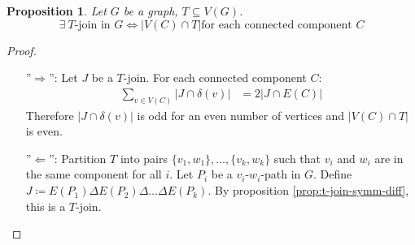\documentclass[11pt, a4paper]{article}
\newcommand{\abs}[1]{\left\lvert#1\right\rvert}
\newcommand{\set}[1]{\{#1\}}
\newtheorem{prop}[theorem]{Proposition}
\theoremstyle{remark}
\theoremstyle{definition}
\begin{document}
\begin{prop}
Let $G$ be a graph, $T\subseteq V(G)$.
\[\exists\ T\text{-join in }G \Leftrightarrow \abs{V(C)\cap T}\text{for each
connected component }C\]
\end{prop}
\begin{proof}\ 
\begin{enumerate}
\item[''$\Rightarrow$'':]
Let $J$ be a $T$-join. For each connected component $C$:
\begin{align*}
	\sum_{v\in V(C)}\abs{J\cap \delta(v)}&=2\abs{J\cap E(C)}
\end{align*}
Therefore $\abs{J\cap\delta(v)}$ is odd for an even number of vertices and
$\abs{V(C)\cap T}$ is even.

\item[''$\Leftarrow$'':]
Partition $T$ into pairs $\set{v_1,w_1},\ldots,\set{v_k,w_k}$ such that
$v_i$ and $w_i$ are in the same component for all $i$. Let $P_i$ be a
$v_i$-$w_i$-path in $G$. Define $J\coloneqq E(P_1)\Delta E(P_2)\Delta\ldots
\Delta E(P_k)$. By proposition \ref{prop:t-join-symm-diff}, this is a
$T$-join.
\end{enumerate}
\end{proof}
\end{document}

